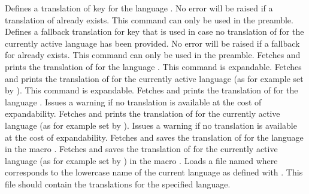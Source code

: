 \documentclass[DIV11,toc=index,toc=bib,numbers=noendperiod]{cnpkgdoc}
\newcommand*\unexpsign{{\tiny\FiveStar}}
\newcommand*\expsign{\textcolor{red}{{\tiny\FiveStar}}}
\renewcommand*\cnpkgdoctriangle{\unexpsign}
\newcommand*\expandable{%
  \def\cnpkgdoctriangle{%
    \expsign
    \gdef\cnpkgdoctriangle{\unexpsign}}}
\begin{document}
\begin{beschreibung}
 \newline
   Defines a translation of key  for the language .
   No error will be raised if a translation of  already exists.
   This command can only be used in the preamble.
 \newline
   Defines a fallback translation for key  that is used in case no
   translation of  for the currently active language has been
   provided.  No error will be raised if a fallback for  already
   exists.  This command can only be used in the preamble.
 \expandable{}\newline
   Fetches and prints the translation of  for the language
   .  This command is expandable.
 \expandable{}\newline
   Fetches and prints the translation of  for the currently active
   language (as for example set by ).  This command is expandable.
 \newline
   Fetches and prints the translation of  for
   the language .  Issues a warning if no translation is
   available at the cost of expandability.
 \newline
   Fetches and prints the translation of  for
   the currently active language (as for example set by ).
   Issues a warning if no translation is available at the cost of
   expandability.
 \newline
   Fetches and saves the translation of  for the language
    in the macro .
 \newline
   Fetches and saves the translation of  for the currently active
   language (as for example set by ) in the macro .
 \newline
   Loads a file named  where  corresponds
   to the lowercase name of the current language as defined with
   .  This file should contain the translations for the
   specified language.
 \newline

\end{beschreibung}
\end{document}
